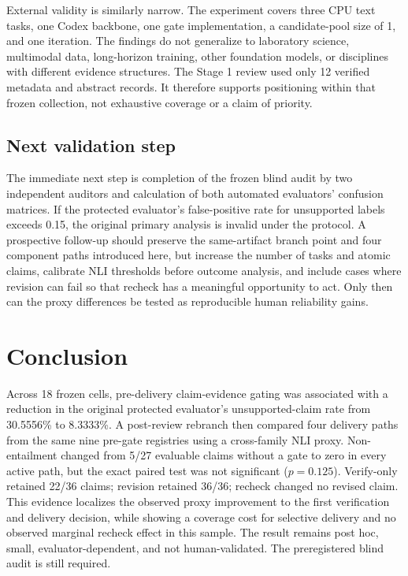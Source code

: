 \documentclass[11pt]{article}
\begin{document}
External validity is similarly narrow. The experiment covers three CPU text tasks, one Codex backbone, one gate implementation, a candidate-pool size of 1, and one iteration. The findings do not generalize to laboratory science, multimodal data, long-horizon training, other foundation models, or disciplines with different evidence structures. The Stage 1 review used only 12 verified metadata and abstract records. It therefore supports positioning within that frozen collection, not exhaustive coverage or a claim of priority.

\subsection{Next validation step}

The immediate next step is completion of the frozen blind audit by two independent auditors and calculation of both automated evaluators' confusion matrices. If the protected evaluator's false-positive rate for unsupported labels exceeds 0.15, the original primary analysis is invalid under the protocol. A prospective follow-up should preserve the same-artifact branch point and four component paths introduced here, but increase the number of tasks and atomic claims, calibrate NLI thresholds before outcome analysis, and include cases where revision can fail so that recheck has a meaningful opportunity to act. Only then can the proxy differences be tested as reproducible human reliability gains.

\section{Conclusion}

Across 18 frozen cells, pre-delivery claim-evidence gating was associated with a reduction in the original protected evaluator's unsupported-claim rate from 30.5556\% to 8.3333\%. A post-review rebranch then compared four delivery paths from the same nine pre-gate registries using a cross-family NLI proxy. Non-entailment changed from 5/27 evaluable claims without a gate to zero in every active path, but the exact paired test was not significant ($p=0.125$). Verify-only retained 22/36 claims; revision retained 36/36; recheck changed no revised claim. This evidence localizes the observed proxy improvement to the first verification and delivery decision, while showing a coverage cost for selective delivery and no observed marginal recheck effect in this sample. The result remains post hoc, small, evaluator-dependent, and not human-validated. The preregistered blind audit is still required.
\end{document}
